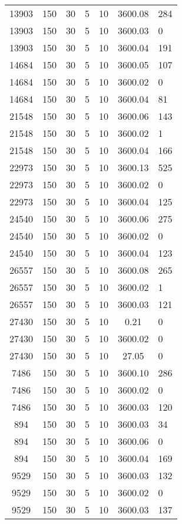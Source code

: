 \begin{tabular}[center]{cccccc}
13903   & 150 & 30 & 5 & 10 & 3600.08 & 284 \\
13903   & 150 & 30 & 5 & 10 & 3600.03 & 0   \\
13903   & 150 & 30 & 5 & 10 & 3600.04 & 191 \\
14684   & 150 & 30 & 5 & 10 & 3600.05 & 107 \\
14684   & 150 & 30 & 5 & 10 & 3600.02 & 0   \\
14684   & 150 & 30 & 5 & 10 & 3600.04 & 81  \\
21548   & 150 & 30 & 5 & 10 & 3600.06 & 143 \\
21548   & 150 & 30 & 5 & 10 & 3600.02 & 1   \\
21548   & 150 & 30 & 5 & 10 & 3600.04 & 166 \\
22973   & 150 & 30 & 5 & 10 & 3600.13 & 525 \\
22973   & 150 & 30 & 5 & 10 & 3600.02 & 0   \\
22973   & 150 & 30 & 5 & 10 & 3600.04 & 125 \\
24540   & 150 & 30 & 5 & 10 & 3600.06 & 275 \\
24540   & 150 & 30 & 5 & 10 & 3600.02 & 0   \\
24540   & 150 & 30 & 5 & 10 & 3600.04 & 123 \\
26557   & 150 & 30 & 5 & 10 & 3600.08 & 265 \\
26557   & 150 & 30 & 5 & 10 & 3600.02 & 1   \\
26557   & 150 & 30 & 5 & 10 & 3600.03 & 121 \\
27430   & 150 & 30 & 5 & 10 & 0.21    & 0   \\
27430   & 150 & 30 & 5 & 10 & 3600.02 & 0   \\
27430   & 150 & 30 & 5 & 10 & 27.05   & 0   \\
7486    & 150 & 30 & 5 & 10 & 3600.10 & 286 \\
7486    & 150 & 30 & 5 & 10 & 3600.02 & 0   \\
7486    & 150 & 30 & 5 & 10 & 3600.03 & 120 \\
894     & 150 & 30 & 5 & 10 & 3600.03 & 34  \\
894     & 150 & 30 & 5 & 10 & 3600.06 & 0   \\
894     & 150 & 30 & 5 & 10 & 3600.04 & 169 \\
9529    & 150 & 30 & 5 & 10 & 3600.03 & 132 \\
9529    & 150 & 30 & 5 & 10 & 3600.02 & 0   \\
9529    & 150 & 30 & 5 & 10 & 3600.03 & 137
\end{tabular}
